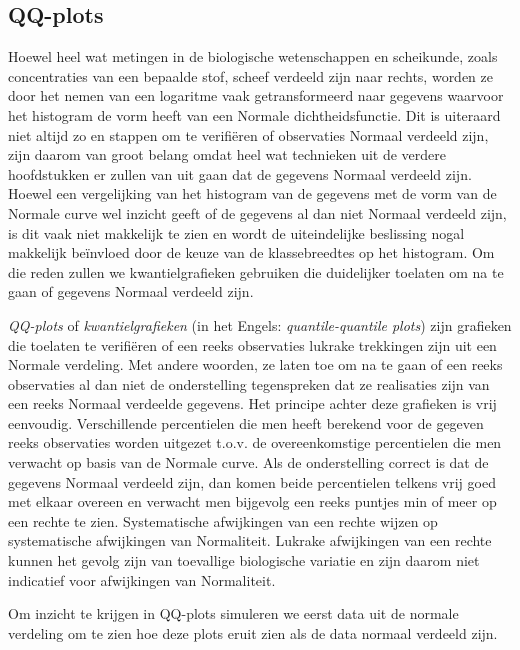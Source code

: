 \documentclass[
  12pt,dutch,coursenotes]{book}
\theoremstyle{definition}
\theoremstyle{definition}
\theoremstyle{definition}
\theoremstyle{definition}
\theoremstyle{remark}
\begin{document}
\hypertarget{sec:qq}{%
\subsection{QQ-plots}\label{sec:qq}}

Hoewel heel wat metingen in de biologische wetenschappen en scheikunde, zoals
concentraties van een bepaalde stof, scheef verdeeld zijn naar rechts,
worden ze door het nemen van een logaritme vaak getransformeerd naar
gegevens waarvoor het histogram de vorm heeft van een Normale dichtheidsfunctie.
Dit is uiteraard niet altijd zo en stappen om te verifiëren of observaties
Normaal verdeeld zijn, zijn daarom van groot belang omdat heel wat technieken uit de verdere hoofdstukken er zullen van uit gaan dat de
gegevens Normaal verdeeld zijn. Hoewel een vergelijking van het histogram
van de gegevens met de vorm van de Normale curve wel inzicht geeft of de
gegevens al dan niet Normaal verdeeld zijn, is dit vaak niet makkelijk te
zien en wordt de uiteindelijke beslissing nogal makkelijk beïnvloed door de keuze
van de klassebreedtes op het histogram. Om die reden zullen we
kwantielgrafieken gebruiken die duidelijker toelaten om na te gaan of
gegevens Normaal verdeeld zijn.

\emph{QQ-plots} of \emph{kwantielgrafieken} (in het Engels: \emph{quantile-quantile plots}) zijn grafieken die toelaten te verifiëren of een
reeks observaties lukrake trekkingen zijn uit een Normale verdeling. Met
andere woorden, ze laten toe om na te gaan of een reeks observaties al dan
niet de onderstelling tegenspreken dat ze realisaties zijn van een reeks
Normaal verdeelde gegevens. Het principe achter deze grafieken is vrij
eenvoudig. Verschillende percentielen die men heeft berekend voor de gegeven
reeks observaties worden uitgezet t.o.v. de overeenkomstige percentielen die
men verwacht op basis van de Normale curve. Als de onderstelling correct is
dat de gegevens Normaal verdeeld zijn, dan komen beide percentielen telkens
vrij goed met elkaar overeen en verwacht men bijgevolg een reeks puntjes min
of meer op een rechte te zien.
Systematische afwijkingen van een rechte wijzen op systematische afwijkingen
van Normaliteit. Lukrake afwijkingen van een rechte kunnen het gevolg zijn
van toevallige biologische variatie en zijn daarom niet indicatief voor afwijkingen van
Normaliteit.

Om inzicht te krijgen in QQ-plots simuleren we eerst data uit de normale verdeling om te zien hoe deze plots eruit zien als de data normaal verdeeld zijn.
\end{document}
